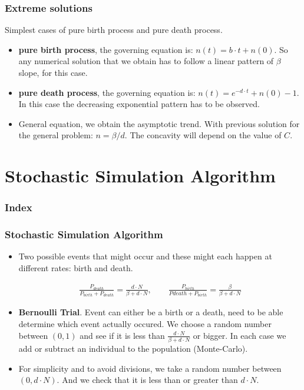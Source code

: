 \documentclass[10pt, usenames, dvipsnames, xcolor=table]{beamer}
\begin{document}
\begin{frame}
\frametitle{Extreme solutions}
Simplest cases of pure birth process and pure death process.
\begin{itemize}
\item \textbf{pure birth process}, the governing equation is: $n(t)=b\cdot t + n(0)$. So any numerical solution that we obtain has to follow a linear pattern of $\beta$ slope, for this case.
\item \textbf{pure death process}, the  governing equation is: $n(t)=e^{-d\cdot t}+n(0)-1$. In this case the decreasing exponential pattern has to be observed.
\item General equation, we obtain the asymptotic trend. With previous solution for the general problem: $n=\beta/d$. The concavity will depend on the value of $C$.
\end{itemize}
\end{frame}


\section{Stochastic Simulation Algorithm}
\begin{frame}
  \frametitle{Index}
  \tableofcontents[currentsection]
\end{frame}
\begin{frame}
\frametitle{Stochastic Simulation Algorithm}

\begin{itemize}

\item Two possible events that might occur and these might each happen at different rates: birth and death.

\begin{align*}
\frac{P_{death}}{P_{birth}+P_{death}}= \frac{d\cdot N}{\beta + d\cdot N}, \qquad \frac{P_{birth}}{P{death}+P_{birth}}= \frac{\beta}{\beta + d\cdot N}
\end{align*}

\item \textbf{Bernoulli Trial}. Event can either be a birth or a death, need to be able determine which event actually occured. We choose a random number between $(0,1)$ and see if it is less than $\frac{d\cdot N}{\beta + d\cdot N}$ or bigger. In each case we add or subtract an individual to the population (Monte-Carlo).

\item For simplicity and to avoid divisions, we take a random number between $(0,d\cdot N)$. And we check that it is less than or greater than $d\cdot N$.
\end{itemize}

\end{frame}
\end{document}
